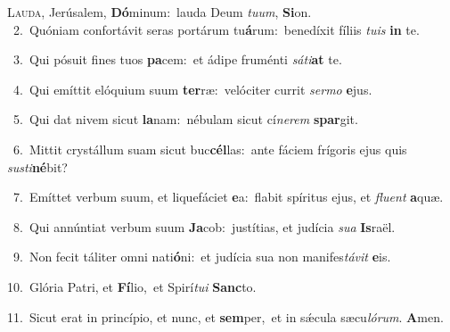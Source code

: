 \lettrine{\initial\textcolor{\initialcolor}{L}}{auda,} Jerúsalem, \textbf{Dó}\-minum:~\star lauda Deum \textit{tu}\-\textit{um}, \textbf{Si}\-on.\\
{\numbfont\textcolor{\numbcolor}{~2.}}~Quóniam confortávit seras portárum tu\-\textbf{á}\-rum:~\star benedíxit fíliis \textit{tu}\-\textit{is} \textbf{in} te.\par
{\numbfont\textcolor{\numbcolor}{~3.}}~Qui pósuit fines tuos \textbf{pa}\-cem:~\star et ádipe fruménti \textit{sá}\-\textit{ti}\textbf{at} te.\par
{\numbfont\textcolor{\numbcolor}{~4.}}~Qui emíttit elóquium suum \textbf{ter}\-ræ:~\star velóciter currit \textit{ser}\-\textit{mo} \textbf{e}\-jus.\par
{\numbfont\textcolor{\numbcolor}{~5.}}~Qui dat nivem sicut \textbf{la}\-nam:~\star nébulam sicut cí\-\textit{ne}\-\textit{rem} \textbf{spar}\-git.\par
{\numbfont\textcolor{\numbcolor}{~6.}}~Mittit crystállum suam sicut buc\-\textbf{cél}\-las:~\star ante fáciem frígoris ejus quis \textit{sus}\-\textit{ti}\textbf{né}bit?\par
{\numbfont\textcolor{\numbcolor}{~7.}}~Emíttet verbum suum, et liquefáciet \textbf{e}\-a:~\star flabit spíritus ejus, et \textit{flu}\-\textit{ent} \textbf{a}\-quæ.\par
{\numbfont\textcolor{\numbcolor}{~8.}}~Qui annúntiat verbum suum \textbf{Ja}\-cob:~\star justítias, et judícia \textit{su}\-\textit{a} \textbf{Is}\-raël.\par
{\numbfont\textcolor{\numbcolor}{~9.}}~Non fecit táliter omni nati\-\textbf{ó}\-ni:~\star et judícia sua non manifes\-\textit{tá}\-\textit{vit} \textbf{e}\-is.\par
{\numbfont\textcolor{\numbcolor}{10.}}~Glória Patri, et \textbf{Fí}\-lio,~\star et Spirí\-\textit{tu}\-\textit{i} \textbf{Sanc}\-to.\par
{\numbfont\textcolor{\numbcolor}{11.}}~Sicut erat in princípio, et nunc, et \textbf{sem}\-per,~\star et in sǽcula sæcu\-\textit{ló}\-\textit{rum}. \textbf{A}\-men.\par
